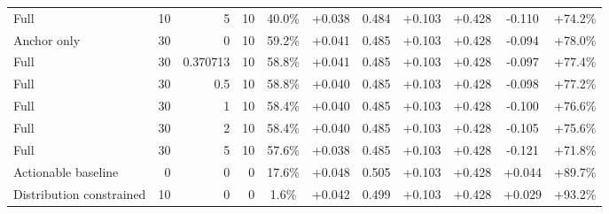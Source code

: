 \begin{table}[htbp]
\begin{tabular}{lrrrccccccc}
Full & 10 & 5 & 10 & 40.0\% & +0.038 & 0.484 & +0.103 & +0.428 & -0.110 & +74.2\% \\
Anchor only & 30 & 0 & 10 & 59.2\% & +0.041 & 0.485 & +0.103 & +0.428 & -0.094 & +78.0\% \\
Full & 30 & 0.370713 & 10 & 58.8\% & +0.041 & 0.485 & +0.103 & +0.428 & -0.097 & +77.4\% \\
Full & 30 & 0.5 & 10 & 58.8\% & +0.040 & 0.485 & +0.103 & +0.428 & -0.098 & +77.2\% \\
Full & 30 & 1 & 10 & 58.4\% & +0.040 & 0.485 & +0.103 & +0.428 & -0.100 & +76.6\% \\
Full & 30 & 2 & 10 & 58.4\% & +0.040 & 0.485 & +0.103 & +0.428 & -0.105 & +75.6\% \\
Full & 30 & 5 & 10 & 57.6\% & +0.038 & 0.485 & +0.103 & +0.428 & -0.121 & +71.8\% \\
Actionable baseline & 0 & 0 & 0 & 17.6\% & +0.048 & 0.505 & +0.103 & +0.428 & +0.044 & +89.7\% \\
Distribution constrained & 10 & 0 & 0 & 1.6\% & +0.042 & 0.499 & +0.103 & +0.428 & +0.029 & +93.2\% \\
\bottomrule
\end{tabular}
\end{table}